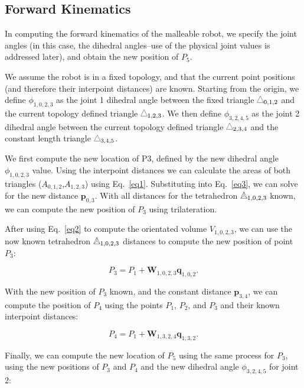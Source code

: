 \subsection{Forward Kinematics}
In computing the forward kinematics of the malleable robot, we specify the joint angles (in this case, the dihedral angles--use of the physical joint values is addressed later), and obtain the new position of $P_5$.

We assume the robot is in a fixed topology, and that the current point positions (and therefore their interpoint distances) are known. Starting from the origin, we define $\phi_{1,0,2,3}$ as the joint 1 dihedral angle between the fixed triangle $\ppp_{0,1,2}$ and the current topology defined triangle $\ppp_{1,2,3}$. We then define $\phi_{3,2,4,5}$ as the joint 2 dihedral angle between the current topology defined triangle $\ppp_{2,3,4}$ and the constant length triangle $\ppp_{3,4,5}$.

We first compute the new location of P3, defined by the new dihedral angle $\phi_{1,0,2,3}$ value. Using the interpoint distances we can calculate the areas of both triangles ($A_{0,1,2}$,$A_{1,2,3}$) using Eq.~\ref{eq1}. Substituting into Eq.~\ref{eq3}, we can solve for the new distance $\mathbf{p}_{0,3}$. With all distances for the tetrahedron $\pppp_{1,0,2,3}$ known, we can compute the new position of $P_3$ using trilateration.

After using Eq.~\ref{eq2} to compute the orientated volume $V_{1,0,2,3}$, we can use the now known tetrahedron $\pppp_{1,0,2,3}$ distances to compute the new position of point $P_3$:

\begin{equation}
    P_3 = P_1+\textbf{W}_{1,0,2,3}\textbf{q}_{1,0,2}.
    \label{eq-p3}
\end{equation}

With the new position of $P_3$ known, and the constant distance $\textbf{p}_{3,4}$, we can compute the position of $P_4$ using the points $P_1$, $P_2$, and $P_3$ and their known interpoint distances:

\begin{equation}
    P_4 = P_1+\textbf{W}_{1,3,2,4}\textbf{q}_{1,3,2}.
    \label{eq-p4}
\end{equation}

Finally, we can compute the new location of $P_5$ using the same process for $P_3$, using the new positions of $P_3$ and $P_4$ and the new dihedral angle $\phi_{3,2,4,5}$ for joint 2:

